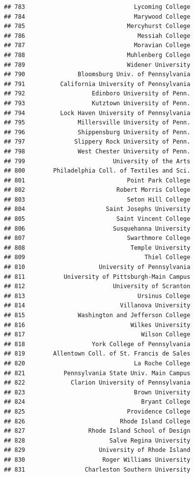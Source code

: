 \documentclass[]{article}
\begin{document}
\begin{verbatim}
## 783                               Lycoming College
## 784                               Marywood College
## 785                             Mercyhurst College
## 786                                Messiah College
## 787                               Moravian College
## 788                             Muhlenberg College
## 789                             Widener University
## 790               Bloomsburg Univ. of Pennsylvania
## 791          California University of Pennsylvania
## 792                   Edinboro University of Penn.
## 793                   Kutztown University of Penn.
## 794          Lock Haven University of Pennsylvania
## 795               Millersville University of Penn.
## 796               Shippensburg University of Penn.
## 797              Slippery Rock University of Penn.
## 798               West Chester University of Penn.
## 799                         University of the Arts
## 800        Philadelphia Coll. of Textiles and Sci.
## 801                             Point Park College
## 802                          Robert Morris College
## 803                             Seton Hill College
## 804                       Saint Josephs University
## 805                          Saint Vincent College
## 806                         Susquehanna University
## 807                             Swarthmore College
## 808                              Temple University
## 809                                  Thiel College
## 810                     University of Pennsylvania
## 811           University of Pittsburgh-Main Campus
## 812                         University of Scranton
## 813                                Ursinus College
## 814                           Villanova University
## 815               Washington and Jefferson College
## 816                              Wilkes University
## 817                                 Wilson College
## 818                   York College of Pennsylvania
## 819        Allentown Coll. of St. Francis de Sales
## 820                               La Roche College
## 821           Pennsylvania State Univ. Main Campus
## 822             Clarion University of Pennsylvania
## 823                               Brown University
## 824                                 Bryant College
## 825                             Providence College
## 826                           Rhode Island College
## 827                  Rhode Island School of Design
## 828                        Salve Regina University
## 829                     University of Rhode Island
## 830                      Roger Williams University
## 831                 Charleston Southern University

\end{verbatim}
\end{document}
